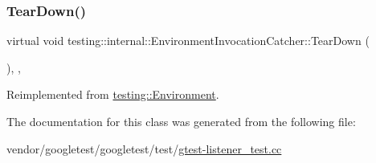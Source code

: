 \subsubsection{\texorpdfstring{Tear\+Down()}{TearDown()}}
{\footnotesize\ttfamily virtual void testing\+::internal\+::\+Environment\+Invocation\+Catcher\+::\+Tear\+Down (\begin{DoxyParamCaption}{ }\end{DoxyParamCaption})\hspace{0.3cm}{\ttfamily [inline]}, {\ttfamily [protected]}, {\ttfamily [virtual]}}



Reimplemented from \hyperlink{classtesting_1_1_environment_a039bdaa705c46b9b88234cf4d3bb6254}{testing\+::\+Environment}.



The documentation for this class was generated from the following file\+:\begin{DoxyCompactItemize}
\item 
vendor/googletest/googletest/test/\hyperlink{gtest-listener__test_8cc}{gtest-\/listener\+\_\+test.\+cc}\end{DoxyCompactItemize}
